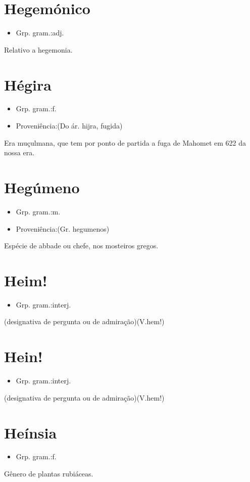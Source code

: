 \documentclass{article}
\begin{document}
\section{Hegemónico}
\begin{itemize}
\item {Grp. gram.:adj.}
\end{itemize}
Relativo a hegemonia.
\section{Hégira}
\begin{itemize}
\item {Grp. gram.:f.}
\end{itemize}
\begin{itemize}
\item {Proveniência:(Do ár. \textunderscore hijra\textunderscore , fugida)}
\end{itemize}
Era muçulmana, que tem por ponto de partida a fuga de Mahomet em 622 da nossa era.
\section{Hegúmeno}
\begin{itemize}
\item {Grp. gram.:m.}
\end{itemize}
\begin{itemize}
\item {Proveniência:(Gr. \textunderscore hegumenos\textunderscore )}
\end{itemize}
Espécie de abbade ou chefe, nos mosteiros gregos.
\section{Heim!}
\begin{itemize}
\item {Grp. gram.:interj.}
\end{itemize}
(designativa de pergunta ou de admiração)(V.hem!)
\section{Hein!}
\begin{itemize}
\item {Grp. gram.:interj.}
\end{itemize}
(designativa de pergunta ou de admiração)(V.hem!)
\section{Heínsia}
\begin{itemize}
\item {Grp. gram.:f.}
\end{itemize}
Gênero de plantas rubiáceas.
\end{document}
